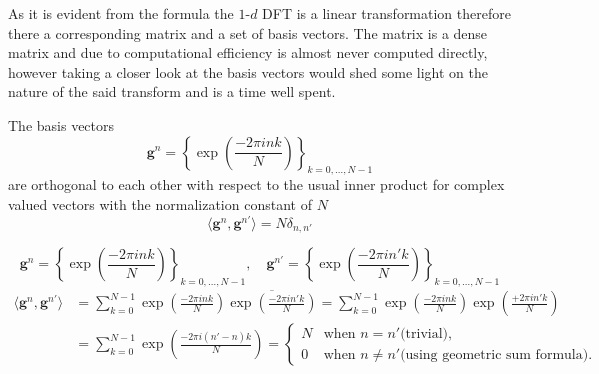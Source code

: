As it is evident from the formula the $1$-$d$ \ac{DFT} is a linear transformation therefore there a corresponding matrix 
and a set of basis vectors. The matrix is a dense matrix\cite{Frazier1999}\cite{Cormen2022} and due to computational 
efficiency\cite{Frazier1999}\cite{Cormen2022} is almost never computed directly, however taking a closer look at the 
basis vectors would shed some light on the nature of the said transform and is a time well spent.

\begin{Prop}\label{Prop:1ddftbasisvectors}
    The basis vectors
    \begin{equation}\label{eq:1ddftbasisvectors}
        \boldsymbol{g}^n = \left\{\exp\left({\frac{-2\pi ink}{N}}\right)\right\}_{k=0,\ldots,N-1}
    \end{equation}
    are orthogonal to each other with respect to the usual inner product for complex valued vectors 
    with the normalization constant of $N$
    \begin{equation}
        \langle\boldsymbol{g}^n,\boldsymbol{g}^{n'}\rangle= N \delta_{n,n'}
    \end{equation}
\end{Prop}

\begin{Proof}
    \begin{equation*}
        \boldsymbol{g}^n = \left\{\exp\left({\frac{-2\pi ink}{N}}\right)\right\}_{k=0,\ldots,N-1}, \quad \boldsymbol{g}^{n'} = \left\{\exp\left({\frac{-2\pi in'k}{N}}\right)\right\}_{k=0,\ldots,N-1}
    \end{equation*}
    \begin{equation*}
    \begin{split} 
        \langle\boldsymbol{g}^n,\boldsymbol{g}^{n'}\rangle &= \sum_{k=0}^{N-1} \exp\left({\frac{-2\pi ink}{N}}\right)\overline{\exp\left({\frac{-2\pi in'k}{N}}\right)}
        = \sum_{k=0}^{N-1} \exp\left({\frac{-2\pi ink}{N}}\right)\exp\left({\frac{+2\pi in'k}{N}}\right)\\
        &= \sum_{k=0}^{N-1} \exp\left({\frac{-2\pi i(n'-n)k}{N}}\right)=
        \begin{cases}
            N & \text{when $n = n'$}\text{(trivial)},\\
            0 & \text{when $n\neq n'$}\text{(using geometric sum formula)}.
        \end{cases}
    \end{split}
\end{equation*}
    
\end{Proof}


